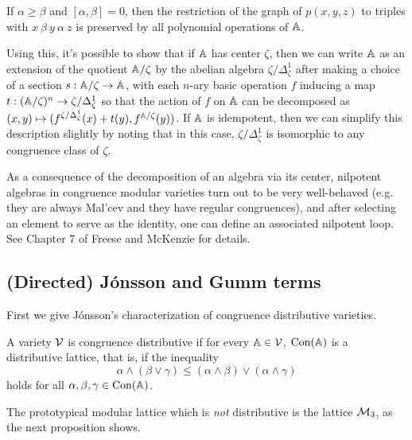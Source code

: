 \documentclass[letterpaper,11pt]{article}
\DeclareMathOperator{\Con}{Con}
\begin{document}
\begin{cor}\label{difference-graph} If $\alpha \ge \beta$ and $[\alpha,\beta] = 0$, then the restriction of the graph of $p(x,y,z)$ to triples with $x\ \beta\ y\ \alpha\ z$ is preserved by all polynomial operations of $\mathbb{A}$.
\end{cor}

Using this, it's possible to show that if $\mathbb{A}$ has center $\zeta$, then we can write $\mathbb{A}$ as an extension of the quotient $\mathbb{A}/\zeta$ by the abelian algebra $\zeta/\Delta_\zeta^1$ after making a choice of a section $s : \mathbb{A}/\zeta \rightarrow \mathbb{A}$, with each $n$-ary basic operation $f$ inducing a map $t : (\mathbb{A}/\zeta)^n \rightarrow \zeta/\Delta_\zeta^1$ so that the action of $f$ on $\mathbb{A}$ can be decomposed as $(x,y) \mapsto (f^{\zeta/\Delta_\zeta^1}(x) + t(y), f^{\mathbb{A}/\zeta}(y))$. If $\mathbb{A}$ is idempotent, then we can simplify this description slightly by noting that in this case, $\zeta/\Delta_\zeta^1$ is isomorphic to any congruence class of $\zeta$.

As a consequence of the decomposition of an algebra via its center, nilpotent algebras in congruence modular varieties turn out to be very well-behaved (e.g. they are always Mal'cev and they have regular congruences), and after selecting an element to serve as the identity, one can define an associated nilpotent loop. See Chapter 7 of Freese and McKenzie \cite{commutator-theory} for details.


\subsection{(Directed) J\'onsson and Gumm terms}

First we give J\'onsson's \cite{jonsson-distributive} characterization of congruence distributive varieties.

\begin{defn} A variety $\mathcal{V}$ is congruence distributive if for every $\mathbb{A} \in \mathcal{V}$, $\Con(\bA)$ is a distributive lattice, that is, if the inequality
\[
\alpha \wedge (\beta \vee \gamma) \le (\alpha \wedge \beta) \vee (\alpha \wedge \gamma)
\]
holds for all $\alpha, \beta, \gamma \in \Con(\bA)$.
\end{defn}

The prototypical modular lattice which is \emph{not} distributive is the lattice $\mathcal{M}_3$, as the next proposition shows.
\end{document}
